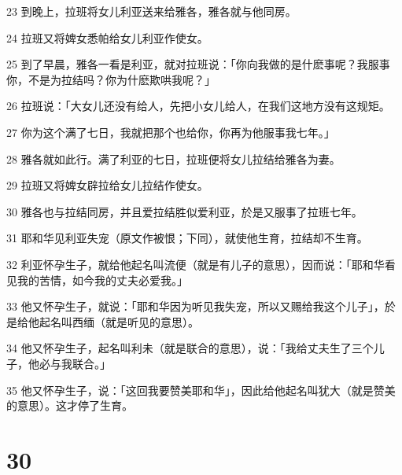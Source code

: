 \par 23 到晚上，拉班将女儿利亚送来给雅各，雅各就与他同房。
\par 24 拉班又将婢女悉帕给女儿利亚作使女。
\par 25 到了早晨，雅各一看是利亚，就对拉班说：「你向我做的是什麽事呢？我服事你，不是为拉结吗？你为什麽欺哄我呢？」
\par 26 拉班说：「大女儿还没有给人，先把小女儿给人，在我们这地方没有这规矩。
\par 27 你为这个满了七日，我就把那个也给你，你再为他服事我七年。」
\par 28 雅各就如此行。满了利亚的七日，拉班便将女儿拉结给雅各为妻。
\par 29 拉班又将婢女辟拉给女儿拉结作使女。
\par 30 雅各也与拉结同房，并且爱拉结胜似爱利亚，於是又服事了拉班七年。
\par 31 耶和华见利亚失宠（原文作被恨；下同），就使他生育，拉结却不生育。
\par 32 利亚怀孕生子，就给他起名叫流便（就是有儿子的意思），因而说：「耶和华看见我的苦情，如今我的丈夫必爱我。」
\par 33 他又怀孕生子，就说：「耶和华因为听见我失宠，所以又赐给我这个儿子」，於是给他起名叫西缅（就是听见的意思）。
\par 34 他又怀孕生子，起名叫利未（就是联合的意思），说：「我给丈夫生了三个儿子，他必与我联合。」
\par 35 他又怀孕生子，说：「这回我要赞美耶和华」，因此给他起名叫犹大（就是赞美的意思）。这才停了生育。

\chapter{30}


